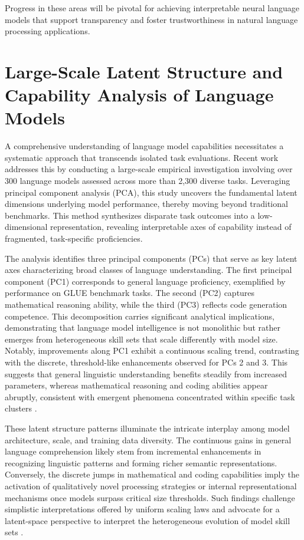 \documentclass[sigconf]{acmart}
\begin{document}
Progress in these areas will be pivotal for achieving interpretable neural language models that support transparency and foster trustworthiness in natural language processing applications.

\section{Large-Scale Latent Structure and Capability Analysis of Language Models}

A comprehensive understanding of language model capabilities necessitates a systematic approach that transcends isolated task evaluations. Recent work \cite{ref45} addresses this by conducting a large-scale empirical investigation involving over 300 language models assessed across more than 2,300 diverse tasks. Leveraging principal component analysis (PCA), this study uncovers the fundamental latent dimensions underlying model performance, thereby moving beyond traditional benchmarks. This method synthesizes disparate task outcomes into a low-dimensional representation, revealing interpretable axes of capability instead of fragmented, task-specific proficiencies.

The analysis identifies three principal components (PCs) that serve as key latent axes characterizing broad classes of language understanding. The first principal component (PC1) corresponds to general language proficiency, exemplified by performance on GLUE benchmark tasks. The second (PC2) captures mathematical reasoning ability, while the third (PC3) reflects code generation competence. This decomposition carries significant analytical implications, demonstrating that language model intelligence is not monolithic but rather emerges from heterogeneous skill sets that scale differently with model size. Notably, improvements along PC1 exhibit a continuous scaling trend, contrasting with the discrete, threshold-like enhancements observed for PCs 2 and 3. This suggests that general linguistic understanding benefits steadily from increased parameters, whereas mathematical reasoning and coding abilities appear abruptly, consistent with emergent phenomena concentrated within specific task clusters \cite{ref45}.

These latent structure patterns illuminate the intricate interplay among model architecture, scale, and training data diversity. The continuous gains in general language comprehension likely stem from incremental enhancements in recognizing linguistic patterns and forming richer semantic representations. Conversely, the discrete jumps in mathematical and coding capabilities imply the activation of qualitatively novel processing strategies or internal representational mechanisms once models surpass critical size thresholds. Such findings challenge simplistic interpretations offered by uniform scaling laws and advocate for a latent-space perspective to interpret the heterogeneous evolution of model skill sets \cite{ref45}.
\end{document}
